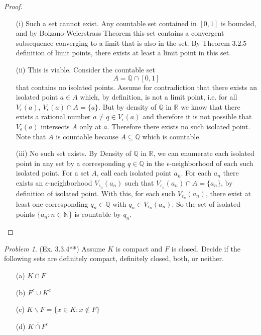 \documentclass[11pt,twoside, reqno]{amsart}
\theoremstyle{remark}
\newtheorem{Prob}{Problem}
\def\R{\mathbb R}
\def\Q{\mathbb Q}
\def\N{\mathbb N}
\begin{document}
\begin{proof}
\begin{enumerate}
    \item [(i)] Such a set cannot exist. Any countable set contained in $[0,1]$ is bounded, and by Bolzano-Weierstrass Theorem this set contains a convergent subsequence converging to a limit that is also in the set. By Theorem 3.2.5 definition of limit points, there exists at least a limit point in this set.
    \item [(ii)] This is viable. Consider the countable set
    $$
        A = \Q \cap [0,1]
    $$
    that contains no isolated points. Assume for contradiction that there exists an isolated point $a \in A$ which, by definition, is not a limit point, i.e. for all $V_\epsilon(a)$, $V_\epsilon(a) \cap A = \{a\}$. But by density of $\Q$ in $\R$ we know that there exists a rational number $a \neq q \in V_\epsilon(a)$ and therefore it is not possible that $V_\epsilon(a)$ intersects $A$ only at $a$. Therefore there exists no such isolated point. Note that $A$ is countable because $A \subseteq \Q$ which is countable.
    \item [(iii)] No such set exists. By Density of $\Q$ in $\R$, we can enumerate each isolated point in any set by a corresponding $q \in \Q$ in the $\epsilon$-neighborhood of each such isolated point. For a set $A$, call each isolated point $a_n$. For each $a_n$ there exists an $\epsilon$-neighborhood $V_{\epsilon_n}(a_n)$ such that $V_{\epsilon_n}(a_n) \cap A = \{a_n\}$, by definition of isolated point. With this, for each such $V_{\epsilon_n}(a_n)$, there exist at least one corresponding $q_n \in \Q$ with $q_n \in V_{\epsilon_n}(a_n)$. So the set of isolated points $\{a_n : n \in \N\}$ is countable by $q_n$.
\end{enumerate}

\end{proof}

\begin{Prob}(Ex. 3.3.4**) Assume $K$ is compact and $F$ is closed. Decide if the following sets are definitely compact, definitely closed, both, or neither.
\begin{enumerate}
    \item [(a)] $K \cap F$
    \item [(b)] $\overline{{F^c \cup K^c}}$
    \item [(c)] $K \backslash F = \{x\in K : x \not \in F\}$
    \item [(d)] $\overline{K \cap F^c}$
\end{enumerate}
\end{Prob}
\end{document}
